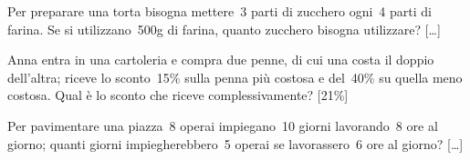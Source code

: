 \begin{multicols}{2}
\begin{esercizio}
\label{ese:3.197}
Per preparare una torta bisogna mettere~3 parti di zucchero ogni~4
parti di farina. Se si utilizzano~500g di farina, quanto zucchero
bisogna utilizzare? \hfill [\dots]
\end{esercizio}



\begin{esercizio}
\label{ese:3.201}
 Anna entra in una cartoleria e compra due penne, di cui una costa il
doppio dell'altra; riceve lo sconto~15\% sulla penna
più costosa e del~40\% su quella meno costosa. Qual è lo sconto che
riceve complessivamente? \hfill [21\%]
\end{esercizio}

% 
% 

\begin{esercizio}
\label{ese:3.205}
Per pavimentare una piazza~8 operai impiegano~10 giorni
lavorando~8 ore al giorno; quanti giorni impiegherebbero~5 operai se
lavorassero~6 ore al giorno? \hfill [\dots]
\end{esercizio}


\end{multicols}
